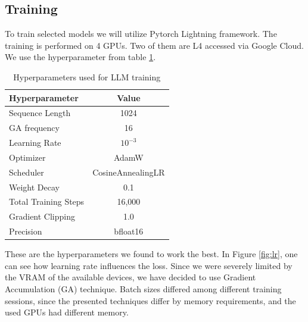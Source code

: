 \documentclass{article}
\begin{document}
\subsection{Training}

To train selected models we will utilize Pytorch Lightning framework. The training is performed on 4 GPUs. Two of them are L4 accessed via Google Cloud. We use the hyperparameter from table \ref{table:hypr}.

\begin{table}[ht]
  \centering
  \begin{tabular}{lc}
    \toprule
    Hyperparameter & Value \\
    \midrule
    Sequence Length        & 1024 \\
    GA frequency & 16 \\
    Learning Rate          & $10^{-3}$ \\
    Optimizer              & AdamW \\
    Scheduler              & CosineAnnealingLR \\
    Weight Decay           & 0.1 \\
    Total Training Steps   & 16,000 \\
    Gradient Clipping      & 1.0 \\
    Precision              & bfloat16 \\
    \bottomrule
  \end{tabular}
  \vspace{0.5em}
  \caption{Hyperparameters used for LLM training}
   \label{table:hypr}
\end{table}

These are the hyperparameters we found to work the best. In Figure \ref{fig:lr}, one can see how learning rate influences the loss. Since we were severely limited by the VRAM of the available devices, we have decided to use Gradient Accumulation (GA) technique. Batch sizes differed among different training sessions, since the presented techniques differ by memory requirements, and the used GPUs had different memory.
\end{document}
